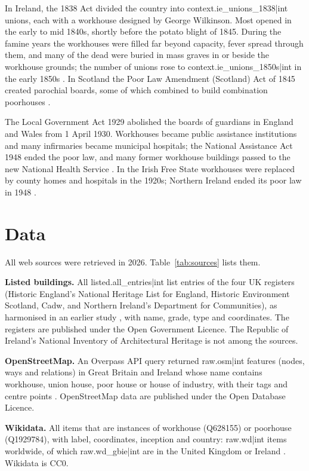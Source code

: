 \documentclass[11pt,a4paper]{article}
\begin{document}
In Ireland, the 1838 Act divided the country into {{context.ie_unions_1838|int}} unions, each with a workhouse designed by George Wilkinson. Most opened in the early to mid 1840s, shortly before the potato blight of 1845. During the famine years the workhouses were filled far beyond capacity, fever spread through them, and many of the dead were buried in mass graves in or beside the workhouse grounds; the number of unions rose to {{context.ie_unions_1850s|int}} in the early 1850s \citep{kinealy,oconnor}. In Scotland the Poor Law Amendment (Scotland) Act of 1845 created parochial boards, some of which combined to build combination poorhouses \citep{higginbotham}.

The Local Government Act 1929 abolished the boards of guardians in England and Wales from 1 April 1930. Workhouses became public assistance institutions and many infirmaries became municipal hospitals; the National Assistance Act 1948 ended the poor law, and many former workhouse buildings passed to the new National Health Service \citep{crowther,fowler}. In the Irish Free State workhouses were replaced by county homes and hospitals in the 1920s; Northern Ireland ended its poor law in 1948 \citep{oconnor}.

\section{Data}
All web sources were retrieved in 2026. Table~\ref{tab:sources} lists them.

\textbf{Listed buildings.} All {{listed.all_entries|int}} list entries of the four UK registers (Historic England's National Heritage List for England, Historic Environment Scotland, Cadw, and Northern Ireland's Department for Communities), as harmonised in an earlier study \citep{listed}, with name, grade, type and coordinates. The registers are published under the Open Government Licence. The Republic of Ireland's National Inventory of Architectural Heritage is not among the sources.

\textbf{OpenStreetMap.} An Overpass API query returned {{raw.osm|int}} features (nodes, ways and relations) in Great Britain and Ireland whose name contains workhouse, union house, poor house or house of industry, with their tags and centre points \citep{osm}. OpenStreetMap data are published under the Open Database Licence.

\textbf{Wikidata.} All items that are instances of workhouse (Q628155) or poorhouse (Q1929784), with label, coordinates, inception and country: {{raw.wd|int}} items worldwide, of which {{raw.wd_gbie|int}} are in the United Kingdom or Ireland \citep{wikidata,qlever}. Wikidata is CC0.
\end{document}
